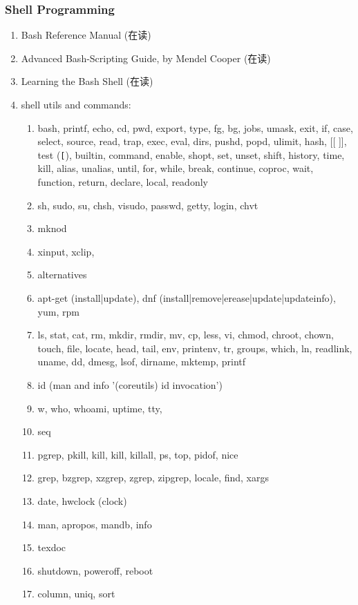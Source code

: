 \documentclass{article}
\begin{document}
\subsubsection{Shell Programming}
%
\begin{enumerate}
    \item Bash Reference Manual (在读)
    \item Advanced Bash-Scripting Guide, by Mendel Cooper (在读)
    \item Learning the Bash Shell (在读)
    \item shell utils and commands:
        \begin{enumerate}
            \item bash, printf, echo, cd, pwd, export, type, fg, bg, jobs, umask, exit, if, case, select, source, read, trap, exec, eval, dirs, pushd, popd, ulimit, hash, [[ ]], test (\verb|[|), builtin, command, enable, shopt, set, unset, shift, history, time, kill, alias, unalias, until, for, while, break, continue, coproc, wait, function, return, declare, local, readonly
            \item sh, sudo, su, chsh, visudo, passwd, getty, login, chvt
            \item mknod
            \item xinput, xclip,
            \item alternatives
            \item apt-get (install|update), dnf (install|remove|erease|update|updateinfo), yum, rpm
            \item ls, stat, cat, rm, mkdir, rmdir, mv, cp, less, vi, chmod, chroot, chown, touch, file, locate, head, tail, env, printenv, tr, groups, which, ln, readlink, uname, dd, dmesg, lsof, dirname, mktemp, printf
            \item id (man and info '(coreutils) id invocation')
            \item w, who, whoami, uptime, tty,
            \item seq
            \item pgrep, pkill, kill, kill, killall, ps, top, pidof, nice
            \item grep, bzgrep, xzgrep, zgrep, zipgrep, locale, find, xargs
            \item date, hwclock (clock)
            \item man, apropos, mandb, info
            \item texdoc
            \item shutdown, poweroff, reboot
            \item column, uniq, sort

\end{enumerate}
\end{enumerate}
\end{document}
